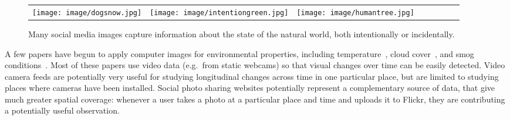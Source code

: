 \begin{figure}[t]
{\tiny{
\begin{center}
\begin{tabular}{@{}c@{\,\,\,}c@{\,\,\,}c@{\,\,\,}c@{\,\,\,}c@{\,\,\,}c@{\,\,\,}c@{\,\,\,}c@{\,\,\,}}
\texttt{[image: image/dogsnow.jpg]} &
\texttt{[image: image/intentiongreen.jpg]} &
\texttt{[image: image/humantree.jpg]} \\
\end{tabular}
\end{center}
}}
\vspace{-12pt}
\caption{Many social media images capture information about the state of the natural world, both intentionally or incidentally.}
\label{fig:flickrexp}
\vspace{-12pt}
\end{figure}


A few papers have begun to apply computer images for environmental
properties, including temperature~\cite{glasner2015hot}, cloud
cover~\cite{murdock2013webcam2satellite}, and smog conditions~\cite{li2015smog}. Most of
these papers use video data (e.g.\ from static webcams) so that visual
changes over time can be easily detected. Video camera feeds are
potentially very useful for studying longitudinal changes across time
in one particular place, but are limited to studying places where
cameras have been installed. Social photo sharing websites potentially
represent a complementary source of data, that give much greater
spatial coverage: whenever a user takes a photo at a particular place
and time and uploads it to Flickr, they are contributing a potentially
useful observation.

